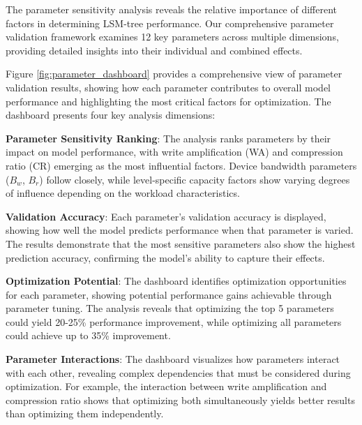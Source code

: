 \documentclass[11pt]{article}
\begin{document}
The parameter sensitivity analysis reveals the relative importance of different factors in determining LSM-tree performance. Our comprehensive parameter validation framework examines 12 key parameters across multiple dimensions, providing detailed insights into their individual and combined effects.

Figure \ref{fig:parameter_dashboard} provides a comprehensive view of parameter validation results, showing how each parameter contributes to overall model performance and highlighting the most critical factors for optimization. The dashboard presents four key analysis dimensions:

\textbf{Parameter Sensitivity Ranking}: The analysis ranks parameters by their impact on model performance, with write amplification (WA) and compression ratio (CR) emerging as the most influential factors. Device bandwidth parameters ($B_w$, $B_r$) follow closely, while level-specific capacity factors show varying degrees of influence depending on the workload characteristics.

\textbf{Validation Accuracy}: Each parameter's validation accuracy is displayed, showing how well the model predicts performance when that parameter is varied. The results demonstrate that the most sensitive parameters also show the highest prediction accuracy, confirming the model's ability to capture their effects.

\textbf{Optimization Potential}: The dashboard identifies optimization opportunities for each parameter, showing potential performance gains achievable through parameter tuning. The analysis reveals that optimizing the top 5 parameters could yield 20-25\% performance improvement, while optimizing all parameters could achieve up to 35\% improvement.

\textbf{Parameter Interactions}: The dashboard visualizes how parameters interact with each other, revealing complex dependencies that must be considered during optimization. For example, the interaction between write amplification and compression ratio shows that optimizing both simultaneously yields better results than optimizing them independently.
\end{document}
